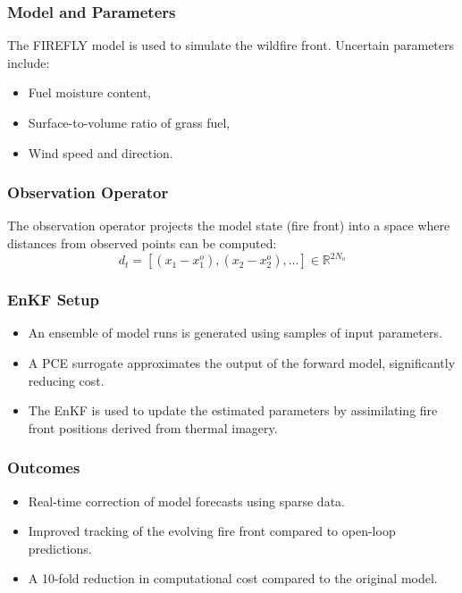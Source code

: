 \documentclass[a4paper]{article}
\begin{document}
\subsubsection*{Model and Parameters}

The FIREFLY model is used to simulate the wildfire front. Uncertain parameters include:
\begin{itemize}
  \item Fuel moisture content,
  \item Surface-to-volume ratio of grass fuel,
  \item Wind speed and direction.
\end{itemize}

\subsubsection*{Observation Operator}

The observation operator projects the model state (fire front) into a space where distances from observed points can be computed:
\[
d_t = [(x_1 - x_1^o), (x_2 - x_2^o), \ldots] \in \mathbb{R}^{2N_o}
\]

\subsubsection*{EnKF Setup}

\begin{itemize}
  \item An ensemble of model runs is generated using samples of input parameters.
  \item A PCE surrogate approximates the output of the forward model, significantly reducing cost.
  \item The EnKF is used to update the estimated parameters by assimilating fire front positions derived from thermal imagery.
\end{itemize}

\subsubsection*{Outcomes}

\begin{itemize}
  \item Real-time correction of model forecasts using sparse data.
  \item Improved tracking of the evolving fire front compared to open-loop predictions.
  \item A 10-fold reduction in computational cost compared to the original model.
\end{itemize}
\end{document}
